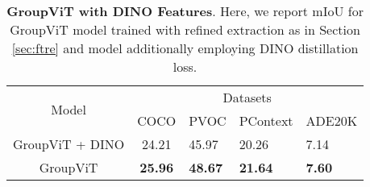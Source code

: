 
\begin{table}[htbp]
  \centering
  \begin{tabular}{c|c|l|l|l}
    \toprule
    \multirow{2}{*}{Model}  & \multicolumn{4}{c}{Datasets} \\
    \cline{2-5}
    &   COCO & PVOC & PContext & ADE20K \\
    \midrule
    GroupViT + DINO & 24.21 & 45.97& 20.26 & 7.14\\
    \midrule
    GroupViT & \textbf{25.96} & \textbf{48.67} & \textbf{21.64} & \textbf{7.60} \\
    
    
    \bottomrule
  \end{tabular}
  \caption[\textbf{GroupViT with DINO Features}]{\textbf{GroupViT with DINO Features}. Here, we report mIoU for GroupViT model trained with refined extraction as in Section \ref{sec:ftre} and model additionally employing DINO distillation loss. }
 \label{tab:DINO}
\end{table}